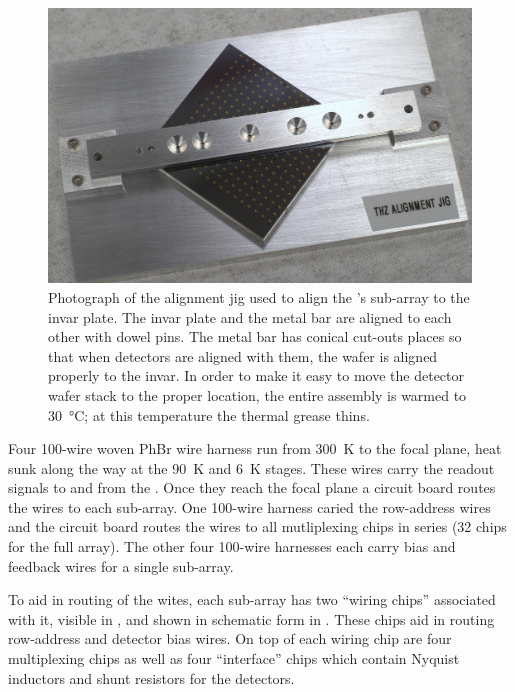 \begin{figure}
\centering
\includegraphics[width=5.5in]{images/ch5-alignment-jig.jpg}
\caption{
  Photograph of the alignment jig used to align the \Imager's sub-array to the invar plate.
  The invar plate and the metal bar are aligned to each other with dowel pins.
  The metal bar has conical cut-outs places so that when detectors are aligned with them, the wafer is aligned properly to the invar.
  In order to make it easy to move the detector wafer stack to the proper location, the entire assembly is warmed to \SI{30}{\celsius}; at this temperature the thermal grease thins.
}
\label{fig:ch5-alignment-jig}
\end{figure}

Four 100-wire woven PhBr wire harness run from \SI{300}{\K} to the focal plane, heat sunk along the way at the \SI{90}{\K} and \SI{6}{\K} stages.
These wires carry the readout signals to and from the \MCE.
Once they reach the focal plane a circuit board routes the wires to each sub-array.
One 100-wire harness caried the row-address wires and the circuit board routes the wires to all mutliplexing chips in series (32 chips for the full array).
The other four 100-wire harnesses each carry \SQUID bias and feedback wires for a single sub-array.

To aid in routing of the wites, each sub-array has two ``wiring chips'' associated with it, visible in , and shown in schematic form in .
These chips aid in routing row-address and detector bias wires.
On top of each wiring chip are four multiplexing chips as well as four ``interface'' chips which contain Nyquist inductors and shunt resistors for the detectors.

